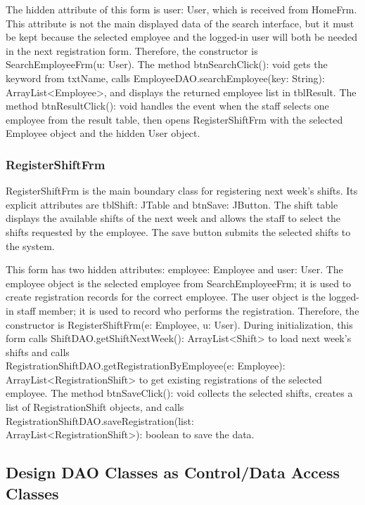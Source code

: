 The hidden attribute of this form is user: User, which is received from HomeFrm. This attribute is not the main displayed data of the search interface, but it must be kept because the selected employee and the logged-in user will both be needed in the next registration form. Therefore, the constructor is SearchEmployeeFrm(u: User). The method btnSearchClick(): void gets the keyword from txtName, calls EmployeeDAO.searchEmployee(key: String): ArrayList<Employee>, and displays the returned employee list in tblResult. The method btnResultClick(): void handles the event when the staff selects one employee from the result table, then opens RegisterShiftFrm with the selected Employee object and the hidden User object.

\subsubsection{RegisterShiftFrm}

RegisterShiftFrm is the main boundary class for registering next week's shifts. Its explicit attributes are tblShift: JTable and btnSave: JButton. The shift table displays the available shifts of the next week and allows the staff to select the shifts requested by the employee. The save button submits the selected shifts to the system.

This form has two hidden attributes: employee: Employee and user: User. The employee object is the selected employee from SearchEmployeeFrm; it is used to create registration records for the correct employee. The user object is the logged-in staff member; it is used to record who performs the registration. Therefore, the constructor is RegisterShiftFrm(e: Employee, u: User). During initialization, this form calls ShiftDAO.getShiftNextWeek(): ArrayList<Shift> to load next week's shifts and calls \\ RegistrationShiftDAO.getRegistrationByEmployee(e: Employee): ArrayList<RegistrationShift> to get existing registrations of the selected employee. The method btnSaveClick(): void collects the selected shifts, creates a list of RegistrationShift objects, and calls RegistrationShiftDAO.saveRegistration(list: \\ ArrayList<RegistrationShift>): boolean to save the data.

\subsection{Design DAO Classes as Control/Data Access Classes}



